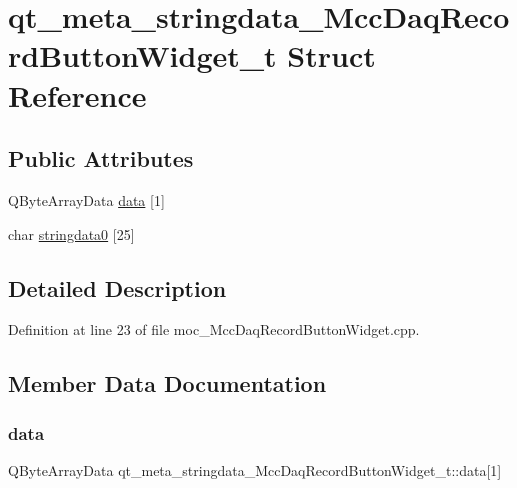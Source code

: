 \hypertarget{structqt__meta__stringdata___mcc_daq_record_button_widget__t}{}\section{qt\+\_\+meta\+\_\+stringdata\+\_\+\+Mcc\+Daq\+Record\+Button\+Widget\+\_\+t Struct Reference}
\label{structqt__meta__stringdata___mcc_daq_record_button_widget__t}
\subsection*{Public Attributes}
\begin{DoxyCompactItemize}
\item 
Q\+Byte\+Array\+Data \hyperlink{structqt__meta__stringdata___mcc_daq_record_button_widget__t_af05d384ede27005268d82420fb66e46d}{data} \mbox{[}1\mbox{]}
\item 
char \hyperlink{structqt__meta__stringdata___mcc_daq_record_button_widget__t_a78b094f20a4791719fec140e3f6b4a50}{stringdata0} \mbox{[}25\mbox{]}
\end{DoxyCompactItemize}


\subsection{Detailed Description}


Definition at line 23 of file moc\+\_\+\+Mcc\+Daq\+Record\+Button\+Widget.\+cpp.



\subsection{Member Data Documentation}
\mbox{\label{structqt__meta__stringdata___mcc_daq_record_button_widget__t_af05d384ede27005268d82420fb66e46d}} 
\subsubsection{\texorpdfstring{data}{data}}
{\footnotesize\ttfamily Q\+Byte\+Array\+Data qt\+\_\+meta\+\_\+stringdata\+\_\+\+Mcc\+Daq\+Record\+Button\+Widget\+\_\+t\+::data\mbox{[}1\mbox{]}}



